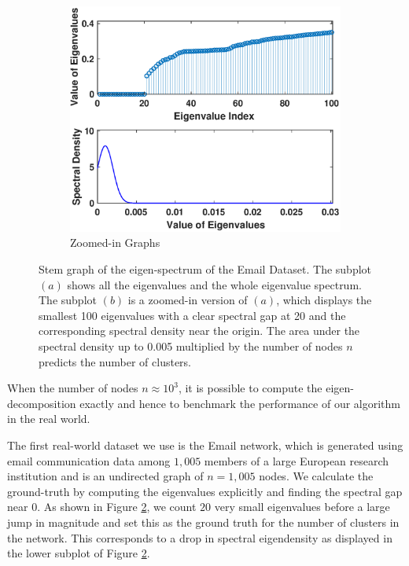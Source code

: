 \documentclass[letterpaper]{article} %
\begin{document}
\begin{figure}
	\begin{subfigure}
		\centering
		\includegraphics[trim=0cm 0cm 0.1cm 0.8cm, clip, width=1.0\linewidth]{Figures/Stem_Density_Email2.eps}
		\caption{Zoomed-in Graphs}
		\label{subfig:emailerror2}	
	\end{subfigure}%
	\caption{Stem graph of the eigen-spectrum of the Email Dataset. The subplot $(a)$ shows all the eigenvalues and the whole eigenvalue spectrum. The subplot $(b)$ is a zoomed-in version of $(a)$, which displays the smallest 100 eigenvalues with a clear spectral gap at 20 and the corresponding spectral density near the origin. The area under the spectral density up to 0.005 multiplied by the number of nodes $n$ predicts the number of clusters.}
	\label{fig:email}	
\end{figure} 

When the number of nodes $n \approx 10^{3}$, it is possible to compute the eigen-decomposition exactly and hence to benchmark the performance of our algorithm in the real world. 

The first real-world dataset we use is the Email network, which is generated using email communication data among $1,005$ members of a large European research institution and is an undirected graph of $n=1,005$ nodes. We calculate the ground-truth by computing the eigenvalues explicitly and finding the spectral gap near $0$. As shown in Figure \ref{fig:email}, we count $20$ very small eigenvalues before a large jump in magnitude and set this as the ground truth for the number of clusters in the network. This corresponds to a drop in spectral eigendensity as displayed in the lower subplot of Figure \ref{fig:email}. 
\end{document}
